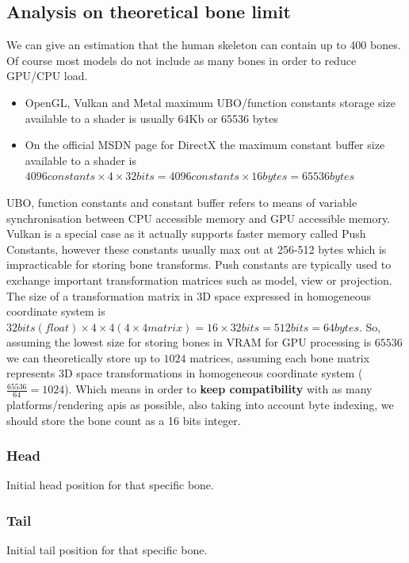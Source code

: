 \subsection{Analysis on theoretical bone limit}
We can give an estimation that the human skeleton can contain up to 400 bones. Of course most models do not include as many bones in order to reduce GPU/CPU load.
\begin{itemize}
    \item OpenGL, Vulkan and Metal maximum UBO/function constants storage size available to a shader is usually 64Kb or 65536 bytes
    \item On the official MSDN page \cite{MSDNConstantBuffers} for DirectX the maximum constant buffer size available to a shader is $4096 constants \times 4 \times 32 bits = 4096 constants \times 16 bytes = 65536 bytes$
\end{itemize}
UBO, function constants and constant buffer refers to means of variable synchronisation between CPU accessible memory and GPU accessible memory. Vulkan is a special case as it actually supports faster memory called Push Constants, however these constants usually max out at 256-512 bytes which is impracticable for storing bone transforms. Push constants are typically used to exchange important transformation matrices such as model, view or projection.
The size of a transformation matrix in 3D space expressed in homogeneous coordinate system \cite{HomogeneousCoordinates} is $32 bits (float) \times 4 \times 4 (4\times4 matrix) = 16 \times 32 bits = 512 bits = 64 bytes$.\newline
So, assuming the lowest size for storing bones in VRAM for GPU processing is $65536$ we can theoretically store up to $1024$ matrices, assuming each bone matrix represents 3D space transformations in homogeneous coordinate system ($\frac{65536}{64} = 1024$).\newline
Which means in order to \textbf{keep compatibility} with as many platforms/rendering apis as possible, also taking into account byte indexing, we should store the bone count as a 16 bits integer.

\subsubsection{Head}
Initial head position for that specific bone.

\subsubsection{Tail}
Initial tail position for that specific bone.

